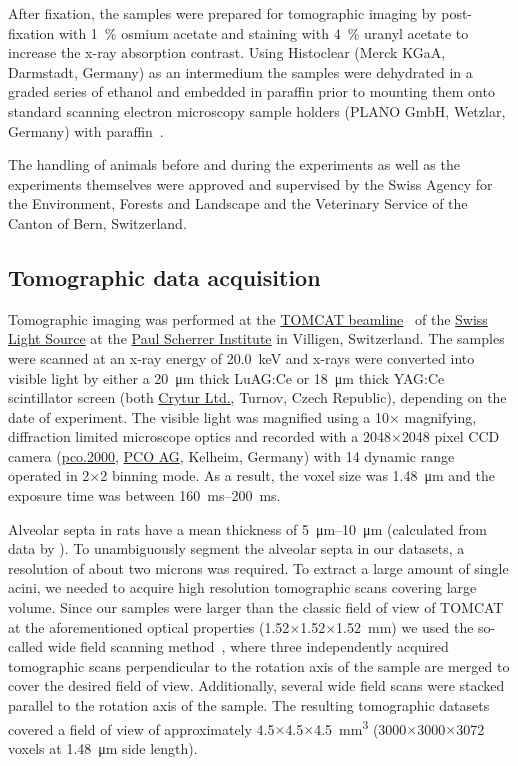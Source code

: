 \documentclass[draft,a4paper,DIVcalc,abstract,english]{scrartcl}
\begin{document}
After fixation, the samples were prepared for tomographic imaging by post-fixation with \SI{1}{\percent} osmium acetate and staining with \SI{4}{\percent} uranyl acetate to increase the x-ray absorption contrast.
Using Histoclear (Merck KGaA, Darmstadt, Germany) as an intermedium the samples were dehydrated in a graded series of ethanol and embedded in paraffin prior to mounting them onto standard scanning electron microscopy sample holders (PLANO GmbH, Wetzlar, Germany) with paraffin~\citep{Tsuda2008}.

The handling of animals before and during the experiments as well as the experiments themselves were approved and supervised by the Swiss Agency for the Environment, Forests and Landscape and the Veterinary Service of the Canton of Bern, Switzerland.

\subsection{Tomographic data acquisition}
Tomographic imaging was performed at the \href{http://www.psi.ch/sls/tomcat/}{TOMCAT beamline}~\citep{Stampanoni2006a} of the \href{http://www.psi.ch/sls/}{Swiss Light Source} at the \href{http://www.psi.ch/}{Paul Scherrer Institute} in Villigen, Switzerland.
The samples were scanned at an x-ray energy of \SI{20.0}{\kilo\electronvolt} and x-rays were converted into visible light by either a \SI{20}{\micro\meter} thick LuAG:Ce or \SI{18}{\micro\meter} thick YAG:Ce scintillator screen (both \href{http://www.crytur.cz/}{Crytur Ltd.}, Turnov, Czech Republic), depending on the date of experiment.
The visible light was magnified using a 10\(\times\) magnifying, diffraction limited microscope optics and recorded with a 2048\(\times\)2048 pixel CCD camera (\href{http://www.pco.de/sensitive-cameras/pco2000/}{pco.2000}, \href{http://www.pco.de/}{PCO AG}, Kelheim, Germany) with \SI{14}{\bit} dynamic range operated in 2\(\times\)2 binning mode.
As a result, the voxel size was \SI{1.48}{\micro\meter} and the exposure time was between \SIrange{160}{200}{\milli\second}.

Alveolar septa in rats have a mean thickness of \SIrange{5}{10}{\micro\meter} (calculated from data by \citet{Burri1974}).
To unambiguously segment the alveolar septa in our datasets, a resolution of  about two microns was required.
To extract a large amount of single acini, we needed to acquire high resolution tomographic scans covering large volume.
Since our samples were larger than the classic field of view of TOMCAT at the aforementioned optical properties (1.52\(\times\)1.52\(\times\)\SI{1.52}{\milli\meter}) we used the so-called wide field scanning method~\citep{Haberthuer2010a}, where three independently acquired tomographic scans perpendicular to the rotation axis of the sample are merged to cover the desired field of view.
Additionally, several wide field scans were stacked parallel to the rotation axis of the sample.
The resulting tomographic datasets covered a field of view of approximately 4.5\(\times\)4.5\(\times\)\SI{4.5}{\milli\meter\cubed} (3000\(\times\)3000\(\times\)3072 voxels at \SI{1.48}{\micro\meter} side length).
\end{document}
